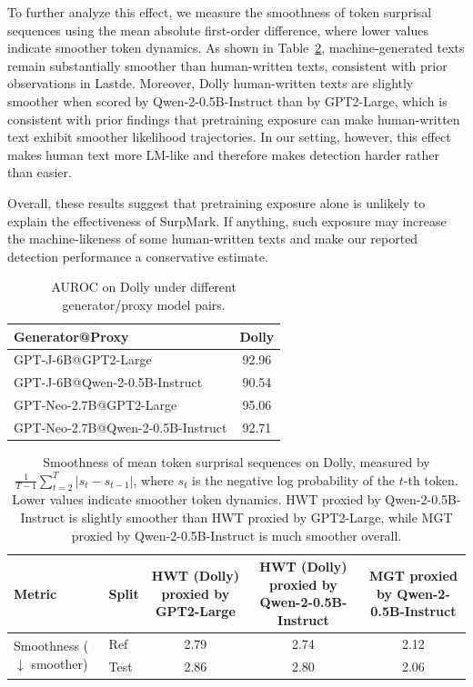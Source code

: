 \documentclass{article}
\theoremstyle{plain}
\theoremstyle{definition}
\theoremstyle{remark}
\begin{document}
To further analyze this effect, we measure the smoothness of token surprisal sequences using the mean absolute first-order difference, where lower values indicate smoother token dynamics. 
As shown in Table~\ref{tab:surprisal_smoothness}, machine-generated texts remain substantially smoother than human-written texts, consistent with prior observations in Lastde. 
Moreover, Dolly human-written texts are slightly smoother when scored by Qwen-2-0.5B-Instruct than by GPT2-Large, which is consistent with prior findings that pretraining exposure can make human-written text exhibit smoother likelihood trajectories. 
In our setting, however, this effect makes human text more LM-like and therefore makes detection harder rather than easier.

Overall, these results suggest that pretraining exposure alone is unlikely to explain the effectiveness of SurpMark. 
If anything, such exposure may increase the machine-likeness of some human-written texts and make our reported detection performance a conservative estimate.

\begin{table}[htbp]
\centering
\caption{AUROC on Dolly under different generator/proxy model pairs.}
\label{tab:dolly_proxy_auroc}{\small
\begin{tabular}{lc}
\toprule
Generator@Proxy & Dolly \\
\midrule
GPT-J-6B@GPT2-Large & 92.96 \\
GPT-J-6B@Qwen-2-0.5B-Instruct & 90.54 \\
GPT-Neo-2.7B@GPT2-Large & 95.06 \\
GPT-Neo-2.7B@Qwen-2-0.5B-Instruct & 92.71 \\
\bottomrule
\end{tabular}}
\end{table}
\begin{table}[b]
\centering
\caption{Smoothness of mean token surprisal sequences on Dolly, measured by $\frac{1}{T-1}\sum_{t=2}^{T}|s_t-s_{t-1}|$, where $s_t$ is the negative log probability of the $t$-th token. Lower values indicate smoother token dynamics. HWT proxied by Qwen-2-0.5B-Instruct is slightly smoother than HWT proxied by GPT2-Large, while MGT proxied by Qwen-2-0.5B-Instruct is much smoother overall.}
\label{tab:surprisal_smoothness}{\scriptsize
\begin{tabular}{llccc}
\toprule
Metric & Split 
& HWT (Dolly) proxied by GPT2-Large
& HWT (Dolly) proxied by Qwen-2-0.5B-Instruct
& MGT proxied by Qwen-2-0.5B-Instruct \\
\midrule
\multirow{2}{*}{Smoothness ($\downarrow$ smoother)}
& Ref  & 2.79 & 2.74 & 2.12 \\
& Test & 2.86 & 2.80 & 2.06 \\
\bottomrule
\end{tabular}}
\end{table}
\end{document}
